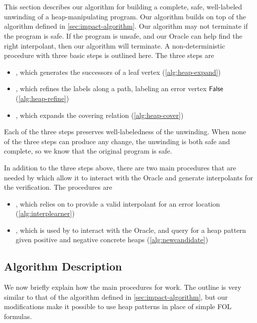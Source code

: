 \section{\verifier}
This section describes our algorithm for building a complete, safe, well-labeled unwinding of a heap-manipulating program. Our algorithm builds on top of the \impact algorithm defined in \autoref{sec:impact-algorithm}. Our algorithm may not terminate if the program is safe. If the program is unsafe, and our Oracle can help find the right interpolant, then our algorithm will terminate. A non-deterministic procedure with three basic steps is outlined here. The three steps are

\begin{itemize}
  \item \expandp, which generates the successors of a leaf vertex (\autoref{alg:heap-expand})
  \item {}, which refines the labels along a path, labeling an error vertex $\mathsf{False}$ (\autoref{alg:heap-refine})
  \item \coverp, which expands the covering relation (\autoref{alg:heap-cover})
\end{itemize}

Each of the three steps preserves well-labeledness of the unwinding. When none of the three steps can produce any change, the unwinding is both safe and complete, so we know that the original program is safe.

In addition to the three steps above, there are two main procedures that are needed by  which allow it to interact with the Oracle and generate interpolants for the verification. The procedures are

\begin{itemize}
  \item \seplearner, which  relies on to provide a valid interpolant for an error location (\autoref{alg:interplearner})
  \item \newcandidate, which is used by \seplearner to interact with the Oracle, and query for a heap pattern given positive and negative concrete heaps (\autoref{alg:newcandidate})
\end{itemize}

\subsection{Algorithm Description}
We now briefly explain how the main procedures for \verifier work. The outline is very similar to that of the \impact algorithm defined in \autoref{sec:impact-algorithm}, but our modifications make it possible to use heap patterns in place of simple FOL formulas.

